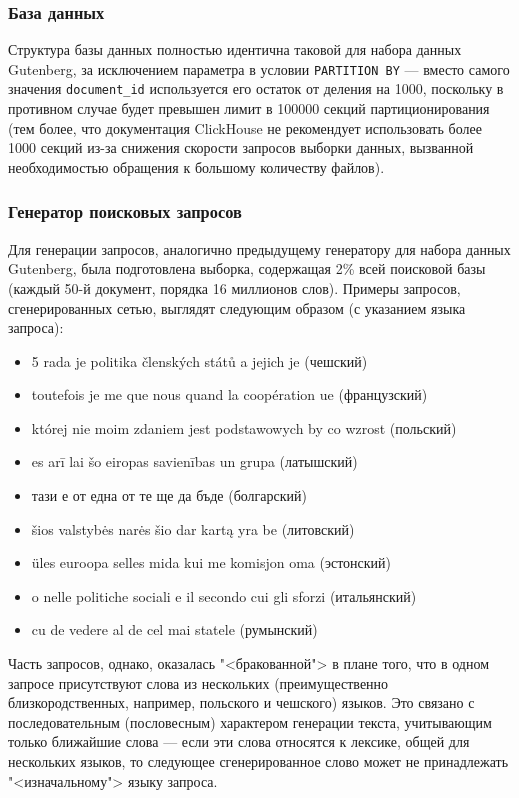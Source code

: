 \subsubsection{База данных}
Структура базы данных полностью идентична таковой для набора данных Gutenberg, за исключением параметра в условии \texttt{PARTITION BY} ---
вместо самого значения \texttt{document\_id} используется его остаток от деления на 1000, поскольку в противном случае будет превышен
лимит в 100000 секций партиционирования (тем более, что документация ClickHouse \cite{clickhouse2021partitions} не рекомендует использовать
более 1000 секций из-за снижения скорости запросов выборки данных, вызванной необходимостью обращения к большому количеству файлов).

\subsubsection{Генератор поисковых запросов}
Для генерации запросов, аналогично предыдущему генератору для набора данных Gutenberg, была подготовлена выборка, содержащая 2\% всей поисковой базы
(каждый 50-й документ, порядка 16 миллионов слов). Примеры запросов, сгенерированных сетью, выглядят следующим образом (с указанием языка запроса):
\begin{itemize}
    \item 5  rada je politika členských států a jejich je (чешский)
    \item toutefois  je me que nous quand la coopération ue (французский)
    \item której nie moim zdaniem jest podstawowych  by co wzrost (польский)
    \item es arī  lai šo eiropas savienības un  grupa (латышский)
    \item тази е от една  от те ще да бъде (болгарский)
    \item šios valstybės narės  šio dar kartą yra be (литовский)
    \item üles euroopa selles  mida kui me komisjon oma (эстонский)
    \item o nelle politiche sociali e il secondo cui gli sforzi (итальянский)
    \item cu de vedere al  de cel mai  statele (румынский)
\end{itemize}

Часть запросов, однако, оказалась "<бракованной"> в плане того, что в одном запросе присутствуют слова из нескольких (преимущественно близкородственных,
например, польского и чешского) языков. Это связано с последовательным (пословесным) характером генерации текста, учитывающим только ближайшие слова ---
если эти слова относятся к лексике, общей для нескольких языков, то следующее сгенерированное слово может не принадлежать "<изначальному"> языку запроса.

